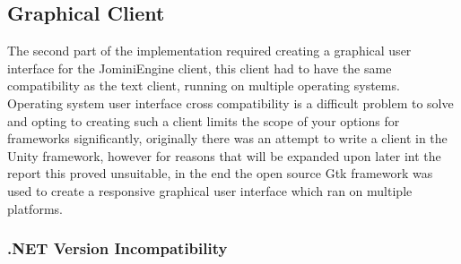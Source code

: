 \documentclass{article}
\begin{document}
\subsection{Graphical Client}
The second part of the implementation required creating a graphical user interface for the JominiEngine client, this client had to have the same compatibility as the text client, running on multiple operating systems. Operating system user interface cross compatibility is a difficult problem to solve and opting to creating such a client limits the scope of your options for frameworks significantly, originally there was an attempt to write a client in the Unity framework, however for reasons that will be expanded upon later int the report this proved unsuitable, in the end the open source Gtk framework\nocite{GTK} was used to create a responsive graphical user interface which ran on multiple platforms.

\subsubsection{.NET Version Incompatibility}
\end{document}
